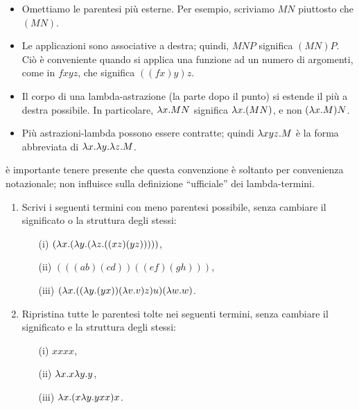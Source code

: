 \documentclass{article}
\begin{document}
\begin{convention}
  \begin{itemize}
  \item Omettiamo le parentesi pi\`u esterne. Per esempio, scriviamo $MN$
    piuttosto che $(MN)$.
  \item Le applicazioni sono associative a destra; quindi, $MNP$ significa
    $(MN)P$. Ci\`o \`e conveniente quando si applica una funzione ad un
    numero di argomenti, come in $fxyz$, che significa $((fx)y)z$. 
  \item Il corpo di una lambda-astrazione (la parte dopo il punto)
  si estende il pi\`u a destra possibile. In particolare, $\lambda
    x.MN$ significa $\lambda x.(MN)$, e non $(\lambda x.M)N$. 
  \item Pi\`u astrazioni-lambda possono essere contratte; quindi $\lambda
    xyz.M$  \`e la forma abbreviata di $\lambda x.\lambda y.\lambda z.M$.
  \end{itemize}
\end{convention}  

\`e importante tenere presente che questa convenzione \`e soltanto 
per convenienza notazionale; non influisce sulla definizione 
``ufficiale'' dei lambda-termini.

\begin{exercise}
  \begin{enumerate}\alphalabels
  \item Scrivi i seguenti termini con meno parentesi possibile,
  senza cambiare il significato o la struttura degli stessi:
    \begin{enumerate}
    \item[(i)] $(\lambda x.(\lambda y.(\lambda z.((xz)(yz)))))$, 
    \item[(ii)] $(((ab)(cd))((ef)(gh)))$, 
    \item[(iii)] $(\lambda x.((\lambda y.(yx))(\lambda v.v)z)u)(\lambda w.w)$.
    \end{enumerate}
  \item Ripristina tutte le parentesi tolte nei seguenti termini,
  senza cambiare il significato e la struttura degli stessi:
    \begin{enumerate}
    \item[(i)] $xxxx$, 
    \item[(ii)] $\lambda x.x\lambda y.y$, 
    \item[(iii)] $\lambda x.(x\lambda y.yxx)x$.
    \end{enumerate}
  \end{enumerate}
\end{exercise}
\end{document}
